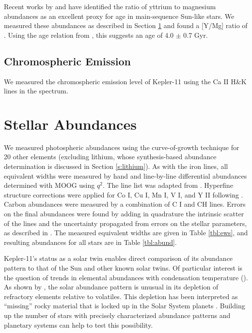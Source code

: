 \documentclass[oneside]{emulateapj}
\begin{document}
Recent works by \citet{Nissen2015} and \citet{TucciMaia2016} have identified the ratio of yttrium to magnesium abundances as an excellent proxy for age in main-sequence Sun-like stars. We measured these abundances as described in Section \ref{s:abundances} and found a [Y/Mg] ratio of . Using the age relation from \citet{TucciMaia2016}, this suggests an age of 4.0 $\pm$ 0.7 Gyr.

\subsection{Chromospheric Emission}

We measured the chromospheric emission level of Kepler-11 using the Ca II H\&K lines in the spectrum. 


\section{Stellar Abundances}
\label{s:abundances}

We measured photospheric abundances using the curve-of-growth technique for 20 other elements (excluding lithium, whose synthesis-based abundance determination is discussed in Section \ref{s:lithium}). As with the iron lines, all equivalent widths were measured by hand and line-by-line differential abundances determined with MOOG using $q^2$. The line list was adapted from . Hyperfine structure corrections were applied for Co I, Cu I, Mn I, V I, and Y II following . Carbon abundances were measured by a combination of C I and CH lines. Errors on the final abundances were found by adding in quadrature the intrinsic scatter of the lines and the uncertainty propagated from errors on the stellar parameters, as described in . The measured equivalent widths are given in Table \ref{tbl:ews}, and resulting abundances for all stars are in Table \ref{tbl:abund}.

Kepler-11's status as a solar twin enables direct comparison of its abundance pattern to that of the Sun and other known solar twins. Of particular interest is the question of trends in elemental abundances with condensation temperature (\tc). As shown by \citet{Melendez2009}, the solar abundance pattern is unusual in its depletion of refractory elements relative to volatiles. This depletion has been interpreted as ``missing'' rocky material that is locked up in the Solar System planets \citep{Chambers2010}. Building up the number of stars with precisely characterized abundance patterns and planetary systems can help to test this possibility.
\end{document}
